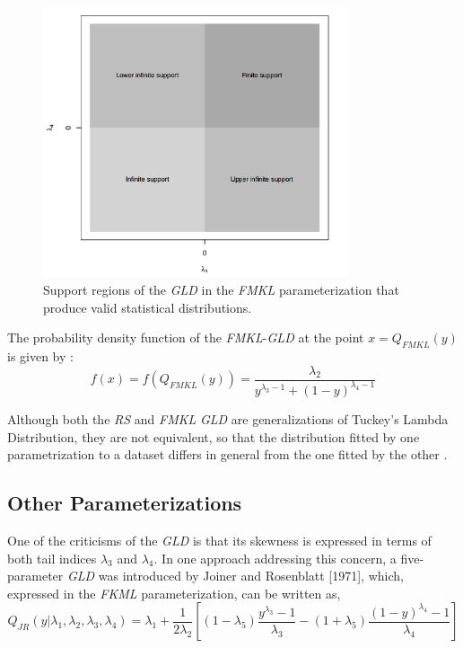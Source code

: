 \begin{figure}[H]
    \centering
    \includegraphics[width=0.8\textwidth]{img/gld/fmkl_regions.png}
    \caption{Support regions of the \textit{GLD} in the \textit{FMKL} parameterization that produce valid statistical
distributions.}
    \label{fig:fmkl_regions}
\end{figure}

The probability density function of the \textit{FMKL}-\textit{GLD} at the point $x=Q_{FMKL}(y)$ is given by \cite{Su2015}:
\begin{equation}\label{eq:fmkl_pdf}
f(x)=f(Q_{FMKL}(y))=\frac{\lambda_{2}}{y^{\lambda_{3}-1}+(1-y)^{\lambda_{4}-1}}
\end{equation}

Although both the \textit{RS} and \textit{FMKL} \textit{GLD} are generalizations of Tuckey's Lambda Distribution, they are not equivalent, so that the distribution fitted by one parametrization to a dataset differs in general from the one fitted by the other \cite{Marcondes2018}.

\subsection{Other Parameterizations}
One of the criticisms of the \textit{GLD} is that its skewness is expressed in terms of both tail indices $\lambda_{3}$ and $\lambda_{4}$. In one approach addressing this concern, a five-parameter \textit{GLD} was introduced by Joiner and Rosenblatt [1971], which, expressed in the \textit{FKML} parameterization, can be written as,
\begin{equation}\label{eq:jr_param}
Q_{JR}(y|\lambda_{1}, \lambda_{2}, \lambda_{3}, \lambda_{4})=\lambda_{1}+\frac{1}{2 \lambda_{2}}\left[(1-\lambda_{5})\frac{y^{\lambda_{3}}-1}{\lambda_{3}} - (1+\lambda_{5})\frac{(1-y)^{\lambda_{4}}-1}{\lambda_{4}} \right] 
\end{equation}


